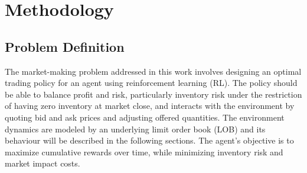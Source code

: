 \section{Methodology}
\label{sec:methodology}

\subsection{Problem Definition}
\label{subsec:problem-definition}

The market-making problem addressed in this work involves designing an optimal trading policy for an agent using reinforcement learning (RL).
The policy should be able to balance profit and risk, particularly inventory risk under the restriction of having zero inventory at market close,
and interacts with the environment by quoting bid and ask prices and adjusting offered quantities.
The environment dynamics are modeled by an underlying limit order book (LOB) and its behaviour will be described in the following sections.
The agent's objective is to maximize cumulative rewards over time, while minimizing inventory risk and market impact costs.






